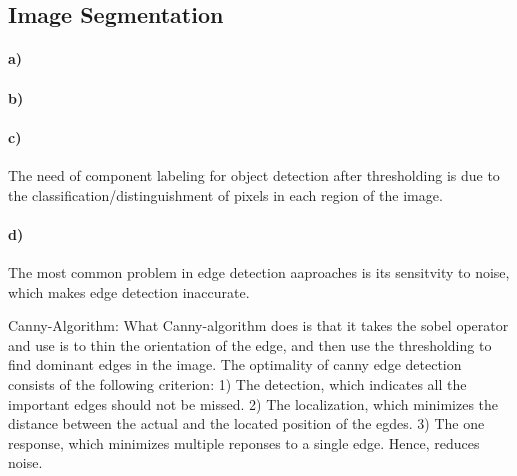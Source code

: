 \documentclass[a4paper,twocolumn]{article}
\begin{document}
	\subsection{Image Segmentation}
	
	\paragraph{a)} %
	
	
	\paragraph{b)} %
	
	\paragraph{c)} %
	
	The need of component labeling for object detection after thresholding is due to the classification/distinguishment of pixels in each region of the image.
	
	\paragraph{d)} %

	The most common problem in edge detection aaproaches is its sensitvity to noise, which makes edge detection inaccurate.
	
	Canny-Algorithm:
	What Canny-algorithm does is that it takes the sobel operator and use is to thin the orientation of the edge, and then use the thresholding to find dominant edges in the image.
	The optimality of canny edge detection consists of the following criterion:
	1) The detection, which indicates all the important edges should not be missed.
	2) The localization, which minimizes the distance between the actual and the located position of the egdes.
	3) The one response, which minimizes multiple reponses to a single edge. Hence, reduces noise.
	
\end{document}
